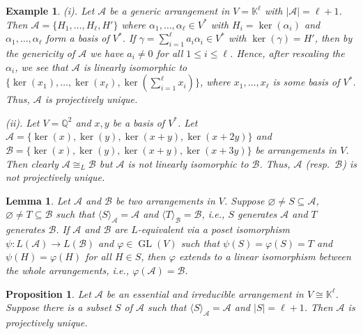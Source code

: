 \documentclass[10pt,a4paper]{amsart}
\newtheorem{example}{Example}
\newtheorem{lemma}{Lemma}
\newtheorem{prop}{Proposition}
\newcommand\BBK{{\mathbb K}}
\newcommand\BBQ{{\mathbb Q}}
\newcommand\CA{{\mathscr A}}
\newcommand\CB{{\mathscr B}}
\newcommand\GL{\operatorname{GL}}
\begin{document}
\begin{example}%
	\label{ex:Proj(non)unique}
	(i). Let $\CA$ be a generic arrangement in $V = \BBK^\ell$ with $|\CA| = \ell+1$.
			Then $\CA = \{H_1,\ldots,H_\ell,H'\}$ where $\alpha_1,\ldots,\alpha_\ell \in V^*$
			with $H_i = \ker(\alpha_i)$ and $\alpha_1,\ldots,\alpha_\ell$ form a basis of $V^*$.
			If $\gamma = \sum_{i=1}^\ell a_i\alpha_i \in V^*$ with $\ker(\gamma) = H'$, then by the genericity of $\CA$
			we have $a_i\neq 0$ for all $1\leq i \leq \ell$. Hence, after rescaling the $\alpha_i$,
			we see that $\CA$ is linearly isomorphic to $\{\ker(x_1),\ldots,\ker(x_\ell),\ker(\sum_{i=1}^\ell x_i)\}$,
			where $x_1,\ldots,x_\ell$ is some basis of $V^*$.
			Thus, $\CA$ is projectively unique.
			
		(ii). Let $V = \BBQ^2$ and $x,y$ be a basis of $V^*$.
			Let $\CA = \{\ker(x),\ker(y),\ker(x+y),\ker(x+2y)\}$ and $\CB = \{\ker(x),\ker(y),\ker(x+y),\ker(x+3y)\}$ be arrangements in $V$.
			Then clearly $\CA \cong_L \CB$ but $\CA$ is not linearly isomorphic to $\CB$.
			Thus, $\CA$ (resp.\ $\CB$) is not projectively unique.
\end{example}

\begin{lemma}
	\label{lem:gen}
	Let $\CA$ and $\CB$ be two arrangements in $V$.
	Suppose $\varnothing \ne S \subseteq \CA$, $\varnothing \ne T \subseteq \CB$
	such that $\langle S \rangle_\CA = \CA$ and $\langle T \rangle_\CB = \CB$, i.e., $S$ generates $\CA$
	and $T$ generates $\CB$.
	If $\CA$ and $\CB$ are $L$-equivalent via a poset isomorphism $\psi:L(\CA)\to L(\CB)$ and $\varphi \in \GL(V)$
	such that $\psi(S) = \varphi(S) = T$ and $\psi(H) = \varphi(H)$ for all $H \in S$, 
	then $\varphi$ extends to a linear isomorphism between the whole arrangements, i.e., 
	$\varphi(\CA) = \CB$.
\end{lemma}

\begin{prop}
	\label{prop:gen}
	Let $\CA$ be an essential and irreducible arrangement in $V \cong \BBK^\ell$.
	Suppose there is a subset $S$ of $\CA$ such that $\langle S \rangle_\CA = \CA$ and $|S| = \ell+1$.
	Then $\CA$ is projectively unique.
\end{prop}
\end{document}
